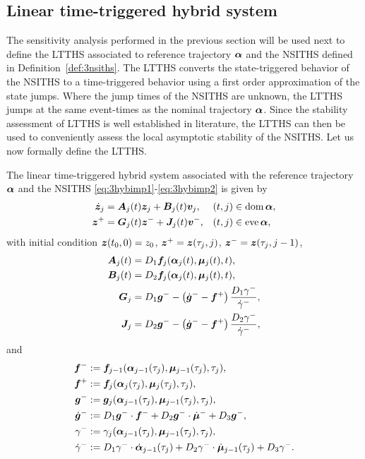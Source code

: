\documentclass[../DC2017114Bouma.tex]{subfiles}
\begin{document}
\subsection{Linear time-triggered hybrid system}
The sensitivity analysis performed in the previous section will be used next to define the LTTHS associated to reference trajectory $\boldsymbol{\alpha}$ and the NSITHS defined in Definition~\ref{def:3nsiths}. The LTTHS converts the state-triggered behavior of the NSITHS to a time-triggered behavior using a first order approximation of the state jumps. Where the jump times of the NSITHS are unknown, the LTTHS jumps at the same event-times as the nominal trajectory $\boldsymbol{\alpha}$. Since the stability assessment of LTTHS is well established in literature, the LTTHS can then be used to conveniently assess the local asymptotic stability of the NSITHS. Let us now formally define the LTTHS.

\begin{sloppypar}
\begin{mydef}[LTTHS]\label{def:3ltths}
The linear time-triggered hybrid system associated with the reference trajectory $\boldsymbol{\alpha}$ and the NSITHS \eqref{eq:3hybimp1}-\eqref{eq:3hybimp2} is given by
\begin{align}
\dot{{\boldsymbol{z}}}_j &= {\boldsymbol{A}}_j(t){\boldsymbol{z}}_j + {\boldsymbol{B}}_j(t){\boldsymbol{v}}_j, &(t,j)&\in \operatorname{\textnormal{dom}}\boldsymbol{\alpha},\\
{\boldsymbol{z}}^+ &= {\boldsymbol{G}}_j(t){\boldsymbol{z}}^- + {\boldsymbol{J}}_j(t){\boldsymbol{v}}^-, &(t,j)&\in \operatorname{\textnormal{eve}}\boldsymbol{\alpha},
\end{align}
with initial condition ${\boldsymbol{z}}(t_0,0)=z_0$, ${\boldsymbol{z}}^+ = {\boldsymbol{z}}(\tau_j,j)$, ${\boldsymbol{z}}^- = {\boldsymbol{z}}(\tau_j,j-1)$,
\begin{align*}
{\boldsymbol{A}}_j(t) &= D_1{\boldsymbol{f}}_j(\boldsymbol{\alpha}_j(t),\boldsymbol{\mu}_j(t),t),\\
{\boldsymbol{B}}_j(t) &= D_2{\boldsymbol{f}}_j(\boldsymbol{\alpha}_j(t),\boldsymbol{\mu}_j(t),t),\\
{\boldsymbol{G}}_j &= D_1{\boldsymbol{g}}^- - \left(\dot{{\boldsymbol{g}}}^- - {\boldsymbol{f}}^+\right)\frac{D_1\gamma^-}{\dot{\gamma}^-},\\
{\boldsymbol{J}}_j &= D_2{\boldsymbol{g}}^- - \left(\dot{{\boldsymbol{g}}}^- - {\boldsymbol{f}}^+\right)\frac{D_2\gamma^-}{\dot{\gamma}^-},
\end{align*}
and
\begin{align*}
{\boldsymbol{f}}^- &:= {\boldsymbol{f}}_{j-1}(\boldsymbol{\alpha}_{j-1}(\tau_j),\boldsymbol{\mu}_{j-1}(\tau_j),\tau_j),\\
{\boldsymbol{f}}^+ &:= {\boldsymbol{f}}_j(\boldsymbol{\alpha}_j(\tau_j),\boldsymbol{\mu}_j(\tau_j),\tau_j),\\
{\boldsymbol{g}}^- &:= {\boldsymbol{g}}_{j}(\boldsymbol{\alpha}_{j-1}(\tau_j),\boldsymbol{\mu}_{j-1}(\tau_j),\tau_j),\\
\dot{{\boldsymbol{g}}}^- &:= D_1{\boldsymbol{g}}^-\cdot {\boldsymbol{f}}^- + D_2{\boldsymbol{g}}^-\cdot \dot{\boldsymbol{\mu}}^- + D_3{\boldsymbol{g}}^-,\\
\gamma^- &:= \gamma_j(\boldsymbol{\alpha}_{j-1}(\tau_j),\boldsymbol{\mu}_{j-1}(\tau_j),\tau_j),\\
\dot{\gamma}^- &:= D_1\gamma^-\cdot\dot{\boldsymbol{\alpha}}_{j-1}(\tau_j) + D_2\gamma^-\cdot\dot{\boldsymbol{\mu}}_{j-1}(\tau_j) + D_3\gamma^-.
\end{align*}
\end{mydef}
\end{sloppypar}
\end{document}
